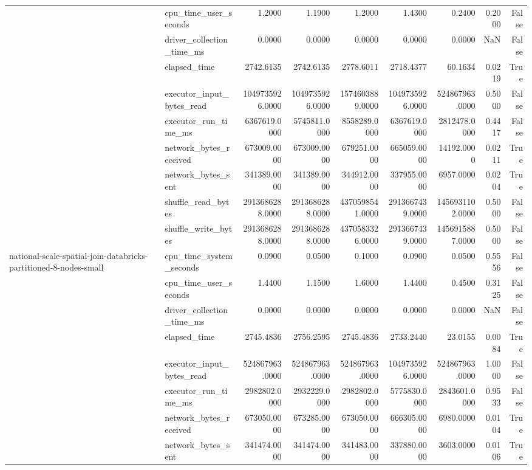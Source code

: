 \begin{tabular}{llrrrrrrr}
 & cpu\_time\_user\_seconds & 1.2000 & 1.1900 & 1.2000 & 1.4300 & 0.2400 & 0.2000 & False \\
 & driver\_collection\_time\_ms & 0.0000 & 0.0000 & 0.0000 & 0.0000 & 0.0000 & NaN & False \\
 & elapsed\_time & 2742.6135 & 2742.6135 & 2778.6011 & 2718.4377 & 60.1634 & 0.0219 & True \\
 & executor\_input\_bytes\_read & 1049735926.0000 & 1049735926.0000 & 1574603889.0000 & 1049735926.0000 & 524867963.0000 & 0.5000 & False \\
 & executor\_run\_time\_ms & 6367619.0000 & 5745811.0000 & 8558289.0000 & 6367619.0000 & 2812478.0000 & 0.4417 & False \\
 & network\_bytes\_received & 673009.0000 & 673009.0000 & 679251.0000 & 665059.0000 & 14192.0000 & 0.0211 & True \\
 & network\_bytes\_sent & 341389.0000 & 341389.0000 & 344912.0000 & 337955.0000 & 6957.0000 & 0.0204 & True \\
 & shuffle\_read\_bytes & 2913686288.0000 & 2913686288.0000 & 4370598541.0000 & 2913667439.0000 & 1456931102.0000 & 0.5000 & False \\
 & shuffle\_write\_bytes & 2913686288.0000 & 2913686288.0000 & 4370583326.0000 & 2913667439.0000 & 1456915887.0000 & 0.5000 & False \\
\cline{1-9}
\multirow[t]{10}{*}{national-scale-spatial-join-databricks-partitioned-8-nodes-small} & cpu\_time\_system\_seconds & 0.0900 & 0.0500 & 0.1000 & 0.0900 & 0.0500 & 0.5556 & False \\
 & cpu\_time\_user\_seconds & 1.4400 & 1.1500 & 1.6000 & 1.4400 & 0.4500 & 0.3125 & False \\
 & driver\_collection\_time\_ms & 0.0000 & 0.0000 & 0.0000 & 0.0000 & 0.0000 & NaN & False \\
 & elapsed\_time & 2745.4836 & 2756.2595 & 2745.4836 & 2733.2440 & 23.0155 & 0.0084 & True \\
 & executor\_input\_bytes\_read & 524867963.0000 & 524867963.0000 & 524867963.0000 & 1049735926.0000 & 524867963.0000 & 1.0000 & False \\
 & executor\_run\_time\_ms & 2982802.0000 & 2932229.0000 & 2982802.0000 & 5775830.0000 & 2843601.0000 & 0.9533 & False \\
 & network\_bytes\_received & 673050.0000 & 673285.0000 & 673050.0000 & 666305.0000 & 6980.0000 & 0.0104 & True \\
 & network\_bytes\_sent & 341474.0000 & 341474.0000 & 341483.0000 & 337880.0000 & 3603.0000 & 0.0106 & True \\

\end{tabular}
